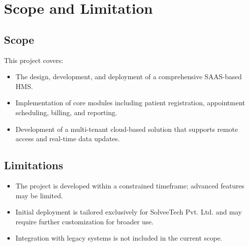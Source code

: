 \section{Scope and Limitation}

\subsection*{Scope}
This project covers:
\begin{itemize}
    \item The design, development, and deployment of a comprehensive SAAS-based HMS.
    \item Implementation of core modules including patient registration, appointment scheduling, billing, and reporting.
    \item Development of a multi-tenant cloud-based solution that supports remote access and real-time data updates.
\end{itemize}
\newpage
\subsection*{Limitations}
\begin{itemize}
    \item The project is developed within a constrained timeframe; advanced features may be limited.
    \item Initial deployment is tailored exclusively for SolveeTech Pvt. Ltd. and may require further customization for broader use.
    \item Integration with legacy systems is not included in the current scope.
\end{itemize}

